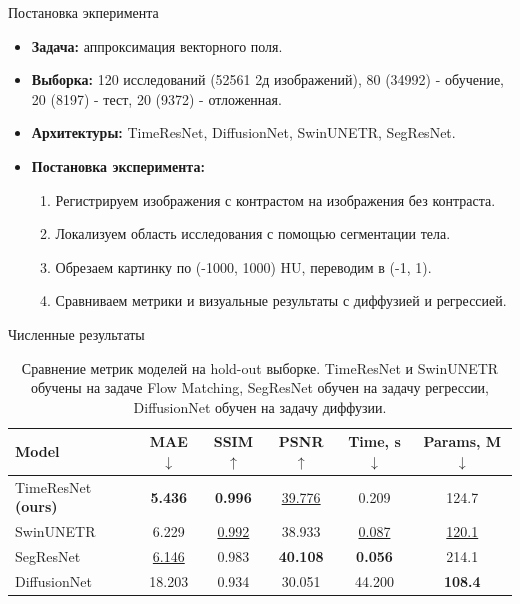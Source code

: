 \documentclass[11pt]{beamer}
\begin{document}
\begin{frame}{Постановка экперимента}
\begin{itemize}
\item \textbf{Задача:} аппроксимация векторного поля.
\item \textbf{Выборка:} 120 исследований (52561 2д изображений), 80 (34992) - обучение, 20 (8197) - тест, 20 (9372) - отложенная. 
\item \textbf{Архитектуры:} TimeResNet, DiffusionNet, SwinUNETR, SegResNet.
\item \textbf{Постановка эксперимента:}
\begin{enumerate}
    \item Регистрируем изображения с контрастом на изображения без контраста.
    \item Локализуем область исследования с помощью сегментации тела.
    \item Обрезаем картинку по (-1000, 1000) HU, переводим в (-1, 1).
    \item Сравниваем метрики и визуальные результаты с диффузией и регрессией.
\end{enumerate}
\end{itemize}
\end{frame}

\begin{frame}{Численные результаты}
\begin{table}[h!]
\centering
\renewcommand{\arraystretch}{1.15}
\begin{tabular}{lccccc}
\toprule
\textbf{Model} & MAE$\downarrow$ & SSIM$\uparrow$ & PSNR$\uparrow$ & Time, s$\downarrow$ & Params, M$\downarrow$ \\
\midrule
TimeResNet \textbf{(ours)} & \textbf{5.436} & \textbf{0.996} & \underline{39.776} & 0.209 & 124.7 \\
SwinUNETR         & 6.229 & \underline{0.992} & 38.933 & \underline{0.087} & \underline{120.1} \\
SegResNet         & \underline{6.146} & 0.983 & \textbf{40.108} & \textbf{0.056} & 214.1 \\
DiffusionNet         & 18.203 & 0.934 & 30.051 & 44.200 & \textbf{108.4} \\
\bottomrule
\end{tabular}
\label{tab:holdout_all}
\caption{Сравнение метрик моделей на hold-out выборке. TimeResNet и SwinUNETR обучены на задаче Flow Matching, SegResNet обучен на задачу регрессии, DiffusionNet обучен на задачу диффузии.}
\end{table}
\end{frame}
\end{document}
